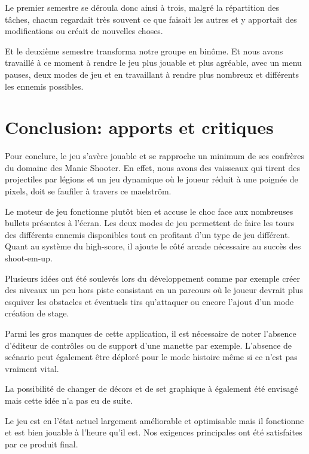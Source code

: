 \documentclass{article}
\begin{document}
Le premier semestre se déroula donc ainsi à trois, malgré la répartition des
tâches, chacun regardait très souvent ce que faisait les autres et y apportait
des modifications ou créait de nouvelles choses. \newline

Et le deuxième semestre transforma notre groupe en binôme. Et nous avons
travaillé à ce moment à rendre le jeu plus jouable et plus agréable, avec un
menu pauses, deux modes de jeu et en travaillant à rendre plus nombreux et
différents les ennemis possibles.

\newpage

\section{Conclusion: apports et critiques}

Pour conclure, le jeu s'avère jouable et se rapproche un minimum de ses confrères du domaine des Manic Shooter. En effet, nous avons des vaisseaux qui tirent des projectiles par légions et un jeu dynamique où le joueur réduit à une poignée de pixels, doit se faufiler à travers ce maelström. \newline

Le moteur de jeu fonctionne plutôt bien et accuse le choc face aux nombreuses bullets présentes à l'écran. Les deux modes de jeu permettent de faire les tours des différents ennemis disponibles tout en profitant d'un type de jeu différent. Quant au système du high-score, il ajoute le côté arcade nécessaire au succès des shoot-em-up. \newline

Plusieurs idées ont été soulevés lors du développement comme par exemple créer des niveaux un peu hors piste consistant en un parcours où le joueur devrait plus esquiver les obstacles et éventuels tirs qu'attaquer ou encore l'ajout d'un mode création de stage. \newline

Parmi les gros manques de cette application, il est nécessaire de noter l'absence d'éditeur de contrôles ou de support d'une manette par exemple. L'absence de scénario peut également être déploré pour le mode histoire même si ce n'est pas vraiment vital.

La possibilité de changer de décors et de set graphique à également été envisagé mais cette idée n'a pas eu de suite. \newline

Le jeu est en l'état actuel largement améliorable et optimisable mais il fonctionne et est bien jouable à l'heure qu'il est. Nos exigences principales ont été satisfaites par ce produit final.
\end{document}
